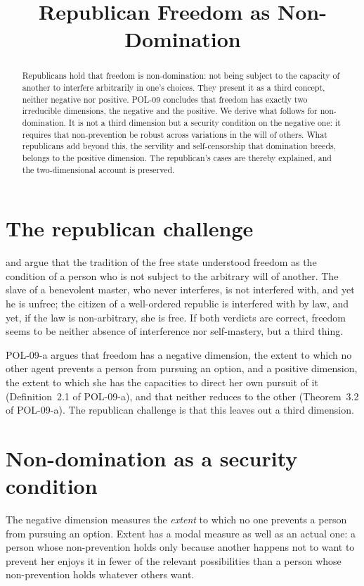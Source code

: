 \documentclass{situationist-preprint}
\title{Republican Freedom as Non-Domination}
\begin{document}
\maketitle

\begin{abstract}
Republicans hold that freedom is non-domination: not being subject to the capacity of another to interfere arbitrarily in one's choices. They present it as a third concept, neither negative nor positive. POL-09 concludes that freedom has exactly two irreducible dimensions, the negative and the positive. We derive what follows for non-domination. It is not a third dimension but a security condition on the negative one: it requires that non-prevention be robust across variations in the will of others. What republicans add beyond this, the servility and self-censorship that domination breeds, belongs to the positive dimension. The republican's cases are thereby explained, and the two-dimensional account is preserved.
\end{abstract}

\section{The republican challenge}

\citet{Pettit1997} and \citet{Skinner1998} argue that the tradition of the free state understood freedom as the condition of a person who is not subject to the arbitrary will of another. The slave of a benevolent master, who never interferes, is not interfered with, and yet he is unfree; the citizen of a well-ordered republic is interfered with by law, and yet, if the law is non-arbitrary, she is free. If both verdicts are correct, freedom seems to be neither absence of interference nor self-mastery, but a third thing.

POL-09-a argues that freedom has a negative dimension, the extent to which no other agent prevents a person from pursuing an option, and a positive dimension, the extent to which she has the capacities to direct her own pursuit of it (Definition~2.1 of POL-09-a), and that neither reduces to the other (Theorem~3.2 of POL-09-a). The republican challenge is that this leaves out a third dimension.

\section{Non-domination as a security condition}

The negative dimension measures the \emph{extent} to which no one prevents a person from pursuing an option. Extent has a modal measure as well as an actual one: a person whose non-prevention holds only because another happens not to want to prevent her enjoys it in fewer of the relevant possibilities than a person whose non-prevention holds whatever others want.
\end{document}
